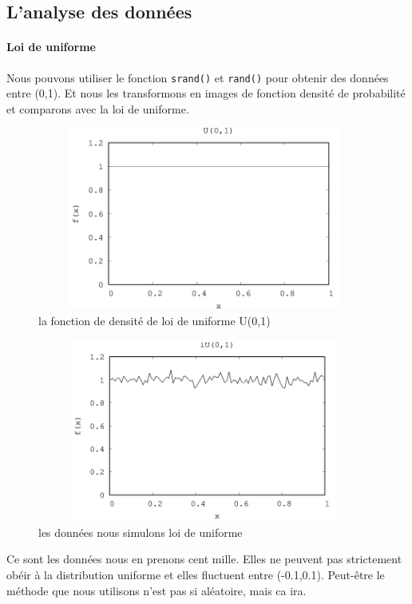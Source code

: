\documentclass[]{article}
\let\oldparagraph\paragraph
\renewcommand{\paragraph}[1]{\oldparagraph{#1}\mbox{}}
\begin{document}
\hypertarget{header-n517}{%
\subsection{L'analyse des données}\label{header-n517}}

\hypertarget{header-n518}{%
\paragraph{Loi de uniforme }\label{header-n518}}

Nous pouvons utiliser le fonction \texttt{srand()} et \texttt{rand()}
pour obtenir des données entre (0,1). Et nous les transformons en images
de fonction densité de probabilité et comparons avec la loi de
uniforme.\\
\begin{figure}
	\centering
	\includegraphics[height=6cm,width=11cm]{images/U01.png}
	\caption{la fonction de densité de loi de uniforme U(0,1)}
	\label{fig1}
\end{figure}

\begin{figure}
	\centering
	\includegraphics[height=6cm,width=11cm]{images/iU01.png}
	\caption{les données nous simulons loi de uniforme}
	\label{fig2}
\end{figure}

Ce sont les données nous en prenons cent mille. Elles ne peuvent pas
strictement obéir à la distribution uniforme et elles fluctuent entre
(-0.1,0.1). Peut-être le méthode que nous utilisons n'est pas si
aléatoire, mais ca ira.
\end{document}
